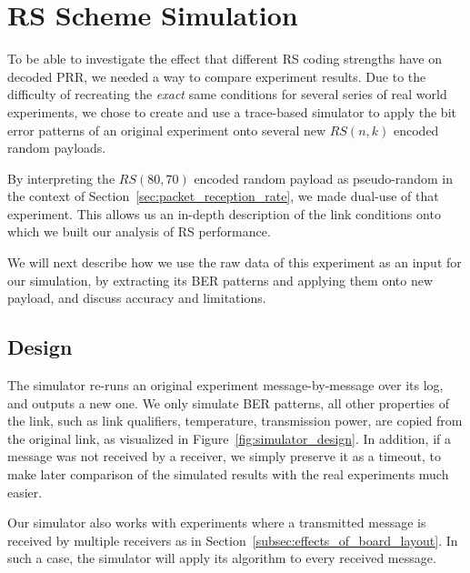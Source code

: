 \section{\acs{RS} Scheme Simulation}
\label{sec:fec_scheme_simulation}

To be able to investigate the effect that different \ac{RS} coding strengths have on decoded \ac{PRR}, we needed a way to compare experiment results.
Due to the difficulty of recreating the \emph{exact} same conditions for several series of real world experiments, we chose to create and use a trace-based simulator to apply the bit error patterns of an original experiment onto several new $RS(n, k)$ encoded random payloads.

By interpreting the $RS(80, 70)$ encoded random payload as pseudo-random in the context of Section~\ref{sec:packet_reception_rate}, we made dual-use of that experiment.
This allows us an in-depth description of the link conditions onto which we built our analysis of \ac{RS} performance.

We will next describe how we use the raw data of this experiment as an input for our simulation, by extracting its \ac{BER} patterns and applying them onto new payload, and discuss accuracy and limitations.

\subsection{Design}

The simulator re-runs an original experiment message-by-message over its log, and outputs a new one.
We only simulate \ac{BER} patterns, all other properties of the link, such as link qualifiers, temperature, transmission power, are copied from the original link, as visualized in Figure~\ref{fig:simulator_design}.
In addition, if a message was not received by a receiver, we simply preserve it as a timeout, to make later comparison of the simulated results with the real experiments much easier.

Our simulator also works with experiments where a transmitted message is received by multiple receivers as in Section~\ref{subsec:effects_of_board_layout}.
In such a case, the simulator will apply its algorithm to every received message.

